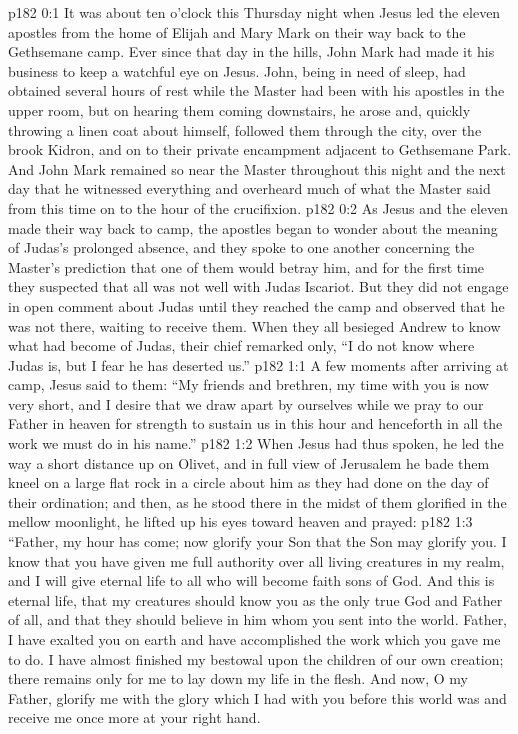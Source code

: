 \author{Midwayer Commission}
\vs p182 0:1 It was about ten o’clock this Thursday night when Jesus led the eleven apostles from the home of Elijah and Mary Mark on their way back to the Gethsemane camp. Ever since that day in the hills, John Mark had made it his business to keep a watchful eye on Jesus. John, being in need of sleep, had obtained several hours of rest while the Master had been with his apostles in the upper room, but on hearing them coming downstairs, he arose and, quickly throwing a linen coat about himself, followed them through the city, over the brook Kidron, and on to their private encampment adjacent to Gethsemane Park. And John Mark remained so near the Master throughout this night and the next day that he witnessed everything and overheard much of what the Master said from this time on to the hour of the crucifixion.
\vs p182 0:2 As Jesus and the eleven made their way back to camp, the apostles began to wonder about the meaning of Judas’s prolonged absence, and they spoke to one another concerning the Master’s prediction that one of them would betray him, and for the first time they suspected that all was not well with Judas Iscariot. But they did not engage in open comment about Judas until they reached the camp and observed that he was not there, waiting to receive them. When they all besieged Andrew to know what had become of Judas, their chief remarked only, “I do not know where Judas is, but I fear he has deserted us.”\plusone
{}
\vs p182 1:1 A few moments after arriving at camp, Jesus said to them: \textcolor{ubdarkred}{“My friends and brethren, my time with you is now very short, and I desire that we draw apart by ourselves while we pray to our Father in heaven for strength to sustain us in this hour and henceforth in all the work we must do in his name.”}
\vs p182 1:2 When Jesus had thus spoken, he led the way a short distance up on Olivet, and in full view of Jerusalem he bade them kneel on a large flat rock in a circle about him as they had done on the day of their ordination; and then, as he stood there in the midst of them glorified in the mellow moonlight, he lifted up his eyes toward heaven and prayed:
\vs p182 1:3 \textcolor{ubdarkred}{“Father, my hour has come; now glorify your Son that the Son may glorify you. I know that you have given me full authority over all living creatures in my realm, and I will give eternal life to all who will become faith sons of God. And this is eternal life, that my creatures should know you as the only true God and Father of all, and that they should believe in him whom you sent into the world. Father, I have exalted you on earth and have accomplished the work which you gave me to do. I have almost finished my bestowal upon the children of our own creation; there remains only for me to lay down my life in the flesh. And now, O my Father, glorify me with the glory which I had with you before this world was and receive me once more at your right hand.}
